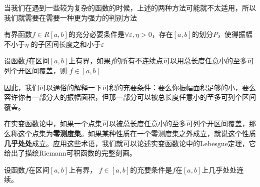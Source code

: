 \documentclass[lang=cn,10pt]{elegantbook}
\begin{document}
当我们在遇到一些较为复杂的函数的时候，上述的两种方法可能就不太适用，所以我们就需要在需要一种更为强力的判别方法
\begin{proposition}[可积的第三充要条件]
	有界函数$f\in R[a,b]$的充分必要条件是$\forall \varepsilon ,\eta >0$，存在$\left[ a,b \right] $的划分$P$，使得振幅不小于$\eta$ 的子区间长度之和小于$\varepsilon $
\end{proposition}
\begin{corollary}
	设函数$f$在区间$[a,b]$上有界，如果$f$的所有不连续点可以用总长度任意小的至多可列个开区间覆盖，则
	$f\in [a,b]$
\end{corollary}
因此，我们可以通俗的解释一下可积的充要条件：要么你振幅面积足够的小，要么容许你有一部分大的振幅面积，但那一部分可以被总长度任意小的至多可列个区间覆盖。

\begin{remark}
	在实变函数论中，如果一个点集可以被总长度任意小的至多可列个开区间覆盖，那么称这个点集为\textbf{零测度集}。如果某种性质在一个零测度集之外成立，就说这个性质\textbf{几乎处处}成立。应用这些术语，我们就可以论述实变函数论中的Lebesgue定理，它给出了描绘Riemann可积函数的完整刻画。
\end{remark}
\begin{proposition}[Lebesgue定理]
	设函数$f$在区间$[a,b]$上有界，
	$f\in [a,b]$的充要条件是$f$在$[a,b]$上几乎处处连续。
\end{proposition}
\end{document}
